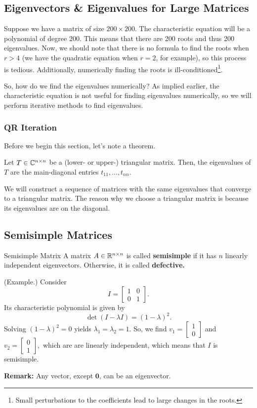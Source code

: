 \documentclass[letterpaper]{article}
\newcommand{\0}{\mathbf{0}}
\begin{document}
\subsection{Eigenvectors \& Eigenvalues for Large Matrices}
Suppose we have a matrix of size $200 \times 200$. The characteristic equation will be a polynomial of degree 200. This means that there are 200 roots and thus 200 eigenvalues. Now, we should note that there is no formula to find the roots when $r > 4$ (we have the quadratic equation when $r = 2$, for example), so this process is tedious. Additionally, numerically finding the roots is ill-conditioned\footnote{Small perturbations to the coefficients lead to large changes in the roots.}.

\bigskip 

So, how do we find the eigenvalues numerically? As implied earlier, the characteristic equation is not useful for finding eigenvalues numerically, so we will perform iterative methods to find eigenvalues. 

\subsubsection{QR Iteration}
Before we begin this section, let's note a theorem. 
\begin{theorem}{}{}
    Let $T \in \mathbb{C}^{n \times n}$ be a (lower- or upper-) triangular matrix. Then, the eigenvalues of $T$ are the main-diagonal entries $t_{11}, \hdots, t_{nn}$. 
\end{theorem}
We will construct a sequence of matrices with the same eigenvalues that converge to a triangular matrix. The reason why we choose a triangular matrix is because its eigenvalues are on the diagonal. 

\subsection{Semisimple Matrices}
\begin{definition}{Semisimple Matrix}{}
    A matrix $A \in \mathbb{R}^{n \times n}$ is called \textbf{semisimple} if it has $n$ linearly independent eigenvectors. Otherwise, it is called \textbf{defective.}
\end{definition}

\begin{mdframed}
    (Example.) Consider \[I = \begin{bmatrix}
        1 & 0 \\ 0 & 1
    \end{bmatrix}.\] Its characteristic polynomial is given by \[\det(I - \lambda I) = (1 -\lambda)^2.\] Solving $(1 - \lambda)^2 = 0$ yields $\lambda_1 = \lambda_2 = 1$. So, we find $v_1 = \begin{bmatrix}
        1 \\ 0
    \end{bmatrix}$ and $v_2 = \begin{bmatrix}
        0 \\ 1
    \end{bmatrix},$ which are are linearly independent, which means that $I$ is semisimple.
\end{mdframed}
\textbf{Remark:} Any vector, except $\0$, can be an eigenvector.
\end{document}
